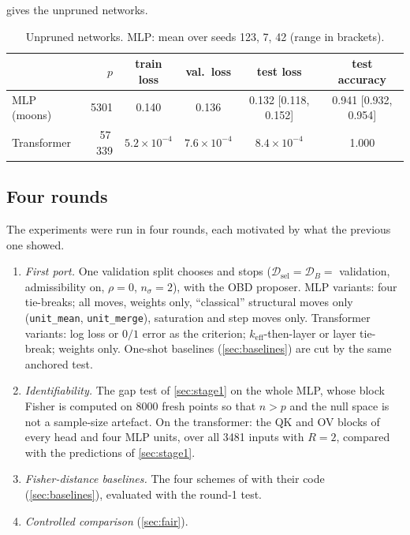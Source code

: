\documentclass[11pt,a4paper]{article}
\theoremstyle{definition}
\newcommand{\D}{\mathcal{D}}
\newcommand{\keff}{k_{\mathrm{eff}}}
\newcommand{\Dsel}{\D_{\mathrm{sel}}}
\newcommand{\DB}{\D_{B}}
\newcommand{\code}[1]{\texttt{#1}}
\begin{document}
 gives the unpruned networks.

\begin{table}[t]
\centering\small
\caption{Unpruned networks. MLP: mean over seeds 123, 7, 42 (range in brackets).}
\label{tab:base}
\setlength{\tabcolsep}{4pt}
\begin{tabular}{@{}lrcccc@{}}
\toprule
& $p$ & train loss & val.\ loss & test loss & test accuracy\\
\midrule
MLP (moons) & 5301 & 0.140 & 0.136 & 0.132 [0.118, 0.152] & 0.941 [0.932, 0.954]\\
Transformer & 57\,339 & $5.2\times10^{-4}$ & $7.6\times10^{-4}$ & $8.4\times10^{-4}$ & 1.000\\
\bottomrule
\end{tabular}
\end{table}

\subsection{Four rounds}
\label{sec:rounds}

The experiments were run in four rounds, each motivated by what the previous one
showed.
\begin{enumerate}[label=\textbf{Round \arabic*.}, leftmargin=*, align=left]
\item \emph{First port.} One validation split chooses and stops ($\Dsel=\DB=$
validation, admissibility on, $\rho=0$, $n_\sigma=2$), with the OBD proposer. MLP
variants: four tie-breaks; all moves, weights only, ``classical'' structural moves only
(\code{unit\_mean}, \code{unit\_merge}), saturation and step moves only. Transformer
variants: log loss or $0/1$ error as the criterion; $\keff$-then-layer or layer
tie-break; weights only. One-shot baselines (\cref{sec:baselines}) are cut by the same
anchored test.
\item \emph{Identifiability.} The gap test of \cref{sec:stage1} on the whole MLP,
whose block Fisher is computed on 8000 fresh points so that $n>p$ and the null space is
not a sample-size artefact. On the transformer: the QK and OV blocks of every head and
four MLP units, over all 3481 inputs with $R=2$, compared with the predictions of
\cref{sec:stage1}.
\item \emph{Fisher-distance baselines.} The four schemes of \citet{berman2026fdist}
with their code (\cref{sec:baselines}), evaluated with the round-1 test.
\item \emph{Controlled comparison} (\cref{sec:fair}).
\end{enumerate}
\end{document}
